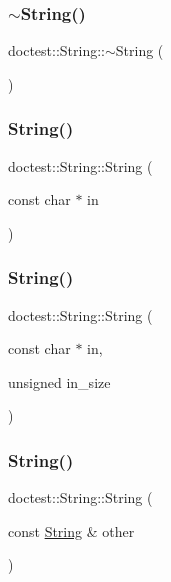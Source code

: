 \subsubsection{\texorpdfstring{$\sim$\+String()}{~String()}}
{\footnotesize\ttfamily doctest\+::\+String\+::$\sim$\+String (\begin{DoxyParamCaption}{ }\end{DoxyParamCaption})}

\mbox{\label{classdoctest_1_1_string_abb4449cbc613cd973ae774c704fca5dd}} 
\subsubsection{\texorpdfstring{String()}{String()}\hspace{0.1cm}{\footnotesize\ttfamily [2/5]}}
{\footnotesize\ttfamily doctest\+::\+String\+::\+String (\begin{DoxyParamCaption}\item[{const char $\ast$}]{in }\end{DoxyParamCaption})}

\mbox{\label{classdoctest_1_1_string_a01d9f84ab0a3dc67b195678b6073dd4c}} 
\subsubsection{\texorpdfstring{String()}{String()}\hspace{0.1cm}{\footnotesize\ttfamily [3/5]}}
{\footnotesize\ttfamily doctest\+::\+String\+::\+String (\begin{DoxyParamCaption}\item[{const char $\ast$}]{in,  }\item[{unsigned}]{in\+\_\+size }\end{DoxyParamCaption})}

\mbox{\label{classdoctest_1_1_string_a27ca7976da20bdebbf225fa496c38ad1}} 
\subsubsection{\texorpdfstring{String()}{String()}\hspace{0.1cm}{\footnotesize\ttfamily [4/5]}}
{\footnotesize\ttfamily doctest\+::\+String\+::\+String (\begin{DoxyParamCaption}\item[{const \mbox{\hyperlink{classdoctest_1_1_string}{String}} \&}]{other }\end{DoxyParamCaption})}


